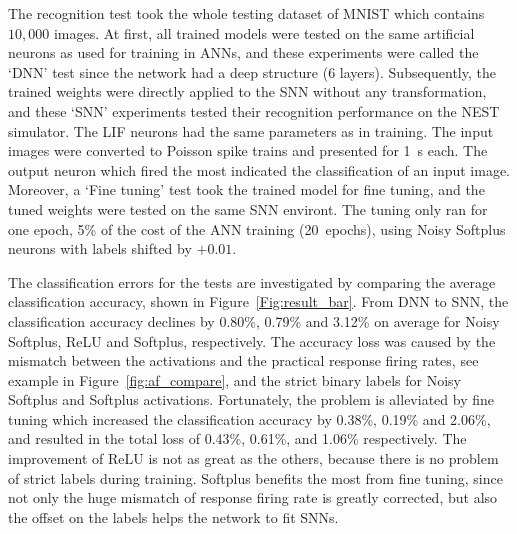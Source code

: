 \documentclass{article}
\begin{document}

The recognition test took the whole testing dataset of MNIST which contains $10,000$ images.
At first, all trained models were tested on the same artificial neurons as used for training in ANNs, and these experiments were called the `DNN' test since the network had a deep structure (6 layers).
Subsequently, the trained weights were directly applied to the SNN without any transformation, and these `SNN' experiments tested their recognition performance on the NEST simulator.
The LIF neurons had the same parameters as in training.
The input images were converted to Poisson spike trains and presented for 1~s each.
The output neuron which fired the most indicated the classification of an input image.
Moreover, a `Fine tuning' test took the trained model for fine tuning, and the tuned weights were tested on the same SNN environt.
The tuning only ran for one epoch, 5\% of the cost of the ANN training (20~epochs), using Noisy Softplus neurons with labels shifted by $+0.01$.

The classification errors for the tests are investigated by comparing the average classification accuracy, shown in Figure~\ref{Fig:result_bar}.
From DNN to SNN, the classification accuracy declines by 0.80\%, 0.79\% and 3.12\% on average for Noisy Softplus, ReLU and Softplus, respectively.
The accuracy loss was caused by the mismatch between the activations and the practical response firing rates, see example in Figure~\ref{fig:af_compare}, and the strict binary labels for Noisy Softplus and Softplus activations.
Fortunately, the problem is alleviated by fine tuning which increased the classification accuracy by 0.38\%, 0.19\% and 2.06\%, and resulted in the total loss of 0.43\%, 0.61\%, and 1.06\% respectively.
The improvement of ReLU is not as great as the others, because there is no problem of strict labels during training.
Softplus benefits the most from fine tuning, since not only the huge mismatch of response firing rate is greatly corrected, but also the offset on the labels helps the network to fit SNNs. 
\end{document}
